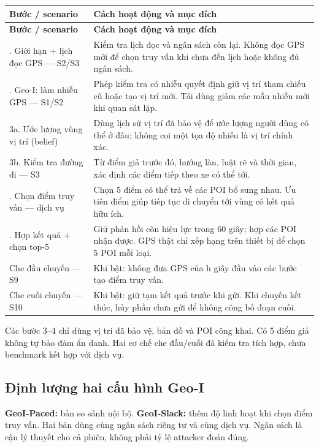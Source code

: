 \documentclass[10pt,a4paper]{article}
\begin{document}
\begingroup\small
\begin{longtable}{@{}P{5.006cm}P{11.913cm}@{}}
\toprule
\textbf{Bước / scenario} & \textbf{Cách hoạt động và mục đích}\\\midrule
\endfirsthead
\toprule
\textbf{Bước / scenario} & \textbf{Cách hoạt động và mục đích}\\\midrule
\endhead
\bottomrule{}. Giới hạn + lịch đọc GPS — S2/S3 & Kiểm tra lịch đọc và ngân sách còn lại. Không đọc GPS mới để chọn truy vấn khi chưa đến lịch hoặc không đủ ngân sách.\\
. Geo-I: làm nhiễu GPS — S1/S2 & Phép kiểm tra có nhiễu quyết định giữ vị trí tham chiếu cũ hoặc tạo vị trí mới. Tái dùng giảm các mẫu nhiễu mới khi quan sát lặp.\\
\addlinespace[3pt]
3a. Ước lượng vùng vị trí (belief) & Dùng lịch sử vị trí đã bảo vệ để ước lượng người dùng có thể ở đâu; không coi một tọa độ nhiễu là vị trí chính xác.\\
\addlinespace[3pt]
3b. Kiểm tra đường đi — S3 & Từ điểm giả trước đó, hướng làn, luật rẽ và thời gian, xác định các điểm tiếp theo xe có thể tới.\\
. Chọn điểm truy vấn — dịch vụ & Chọn 5 điểm có thể trả về các POI bổ sung nhau. Ưu tiên điểm giúp tiếp tục di chuyển tới vùng có kết quả hữu ích.\\
. Hợp kết quả + chọn top-5 & Giữ phản hồi còn hiệu lực trong 60 giây; hợp các POI nhận được. GPS thật chỉ xếp hạng trên thiết bị để chọn 5 POI mỗi loại.\\
\addlinespace[3pt]
Che đầu chuyến — S9 & Khi bật: không đưa GPS của h giây đầu vào các bước tạo điểm truy vấn.\\
\addlinespace[3pt]
Che cuối chuyến — S10 & Khi bật: giữ tạm kết quả trước khi gửi. Khi chuyến kết thúc, hủy phần chưa gửi để không công bố đoạn cuối.\\
\end{longtable}
\endgroup
Các bước 3–4 chỉ dùng vị trí đã bảo vệ, bản đồ và POI công khai. Có 5 điểm giả không tự bảo đảm ẩn danh. Hai cơ chế che đầu/cuối đã kiểm tra tích hợp, chưa benchmark kết hợp với dịch vụ.

\subsection{Định lượng hai cấu hình Geo-I}\label{sub:2.2}
\textbf{GeoI-Paced:} bản so sánh nội bộ. \textbf{GeoI-Slack:} thêm độ linh hoạt khi chọn điểm truy vấn. Hai bản dùng cùng ngân sách riêng tư và cùng dịch vụ. Ngân sách là cận lý thuyết cho cả phiên, không phải tỷ lệ attacker đoán đúng.
\end{document}
